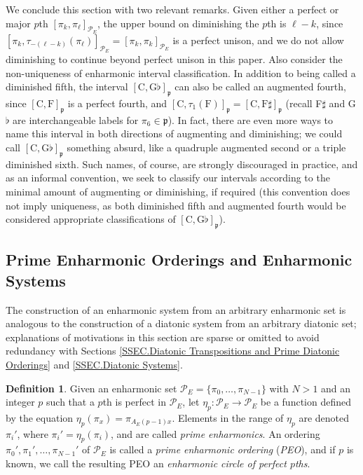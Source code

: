 \documentclass{article}
\theoremstyle{plain}
\theoremstyle{definition}
\newtheorem{definition}[theorem]{Definition}
\theoremstyle{remark}
\begin{document}
We conclude this section with two relevant remarks. Given either a perfect or major $p$th $[\pi_k,\pi_\ell]_{\mathcal{P}_E}$, the upper bound on diminishing the $p$th is $\ell-k$, since $[\pi_k,\tau_{-(\ell-k)}(\pi_\ell)]_{\mathcal{P}_E}=[\pi_k,\pi_k]_{\mathcal{P}_E}$ is a perfect unison, and we do not allow diminishing to continue beyond perfect unison in this paper. Also consider the non-uniqueness of enharmonic interval classification. In addition to being called a diminished fifth, the interval $[\textrm{C},\textrm{G}\flat]_{\mathfrak{p}}$ can also be called an augmented fourth, since $[\textrm{C},\textrm{F}]_{\mathfrak{p}}$ is a perfect fourth, and $[\textrm{C},\tau_1(\textrm{F})]_{\mathfrak{p}}=[\textrm{C},\textrm{F}\sharp]_{\mathfrak{p}}$ (recall F$\sharp$ and G$\flat$ are interchangeable labels for $\pi_6\in\mathfrak{p}$). In fact, there are even more ways to name this interval in both directions of augmenting and diminishing; we could call $[\textrm{C},\textrm{G}\flat]_{\mathfrak{p}}$ something absurd, like a quadruple augmented second or a triple diminished sixth. Such names, of course, are strongly discouraged in practice, and as an informal convention, we seek to classify our intervals according to the minimal amount of augmenting or diminishing, if required (this convention does not imply uniqueness, as both diminished fifth and augmented fourth would be considered appropriate classifications of $[\textrm{C},\textrm{G}\flat]_{\mathfrak{p}}$).

\subsection{Prime Enharmonic Orderings and Enharmonic Systems}
\label{SSEC.Prime Enharmonic Orderings and Enharmonic Systems}

The construction of an enharmonic system from an arbitrary enharmonic set is analogous to the construction of a diatonic system from an arbitrary diatonic set; explanations of motivations in this section are sparse or omitted to avoid redundancy with Sections \ref{SSEC.Diatonic Transpositions and Prime Diatonic Orderings} and \ref{SSEC.Diatonic Systems}.

\begin{definition}
\label{DEF.PEO}
	Given an enharmonic set $\mathcal{P}_E=\{\pi_0,\dots,\pi_{N-1}\}$ with $N>1$ and an integer $p$ such that a $p$th is perfect in $\mathcal{P}_E$, let $\eta_p:\mathcal{P}_E\to\mathcal{P}_E$ be a function defined by the equation $\eta_p(\pi_x)=\pi_{A_E(p-1)x}$. Elements in the range of $\eta_p$ are denoted $\pi_i'$, where $\pi_i'=\eta_p(\pi_i)$, and are called \textit{prime enharmonics}. An ordering $\pi_0',\pi_1',\dots,\pi_{N-1}'$ of $\mathcal{P}_E$ is called a \textit{prime enharmonic ordering} (\textit{PEO}), and if $p$ is known, we call the resulting PEO an \textit{enharmonic circle of perfect $p$ths}.
\end{definition}
\end{document}

